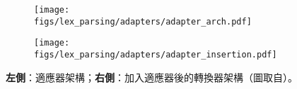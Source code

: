 \begin{figure}[htbp]
    \centering
    \begin{subfigure}[t]{0.5\textwidth}
        \centering
        \texttt{[image: figs/lex\_parsing/adapters/adapter\_arch.pdf]}
    \end{subfigure}%
    \begin{subfigure}[t]{0.5\textwidth}
        \centering
        \texttt{[image: figs/lex\_parsing/adapters/adapter\_insertion.pdf]}
    \end{subfigure}
    \caption{\textbf{左側}：適應器架構；\textbf{右側}：加入適應器後的轉換器架構（圖取自\cite{rebuffi2018efficient}）。}
    \label{fig:adapter}
\end{figure}
